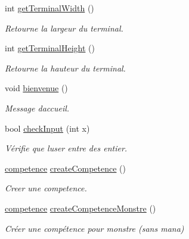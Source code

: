 \begin{DoxyCompactItemize}
\mbox{\label{namespaceio_a71636a15a219ee1dcc177e9749cf20bc}} 
int \hyperlink{namespaceio_a71636a15a219ee1dcc177e9749cf20bc}{get\+Terminal\+Width} ()
\begin{DoxyCompactList}\small\item\em Retourne la largeur du terminal. \end{DoxyCompactList}\item 
\mbox{\label{namespaceio_ab7da8a98a7b636d1d5f0f6eb820f1f81}} 
int \hyperlink{namespaceio_ab7da8a98a7b636d1d5f0f6eb820f1f81}{get\+Terminal\+Height} ()
\begin{DoxyCompactList}\small\item\em Retourne la hauteur du terminal. \end{DoxyCompactList}\item 
void \hyperlink{namespaceio_a7fdf85a0d766d2dcdb9870ae0458826a}{bienvenue} ()
\begin{DoxyCompactList}\small\item\em Message d\textquotesingle{}accueil. \end{DoxyCompactList}\item 
bool \hyperlink{namespaceio_ac79ddb3191a9d00d007eb48deb315942}{check\+Input} (int x)
\begin{DoxyCompactList}\small\item\em Vérifie que l\textquotesingle{}user entre des entier. \end{DoxyCompactList}\item 
\hyperlink{classcompetence}{competence} \hyperlink{namespaceio_a474f817675f4aa2e28f1dac572046eb5}{create\+Competence} ()
\begin{DoxyCompactList}\small\item\em Creer une competence. \end{DoxyCompactList}\item 
\mbox{\label{namespaceio_a15bb99405bc68580d0d386d639a3a23c}} 
\hyperlink{classcompetence}{competence} \hyperlink{namespaceio_a15bb99405bc68580d0d386d639a3a23c}{create\+Competence\+Monstre} ()
\begin{DoxyCompactList}\small\item\em Créer une compétence pour monstre (sans mana) \end{DoxyCompactList}\item 
\mbox{\label{namespaceio_ad3711fbbc414b4d27c255ad8347d3ca2}} 

\end{DoxyCompactItemize}
